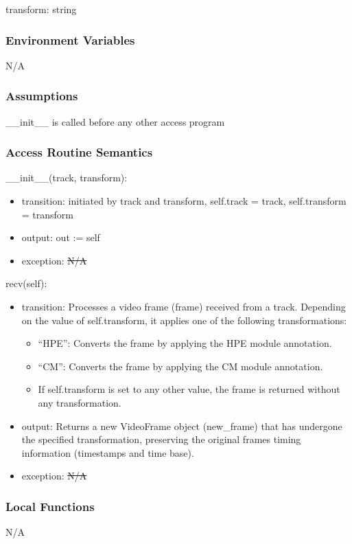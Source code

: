 \documentclass[12pt, titlepage]{article}
\newcommand{\rt}[1]{\textcolor{red}{#1}}
\begin{document}
transform: string

\subsubsection{Environment Variables}
N/A

\subsubsection{Assumptions}
\_\_init\_\_ is called before any other access program

\subsubsection{Access Routine Semantics}

\noindent \_\_init\_\_(track, transform):
\begin{itemize}
  \item transition: initiated by track and transform, self.track = track, self.transform = transform
  \item output: out := self
  \item exception: \sout{N/A} \rt{}
\end{itemize}

\noindent recv(self):
\begin{itemize}
\item transition: Processes a video frame (frame) received from a track. Depending
  on the value of self.transform, it applies one of the following
  transformations:
  \begin{itemize}
  \item ``HPE'': Converts the frame by applying the HPE module
    annotation.
  \item ``CM'': Converts the frame by applying the CM module annotation.
  \item If self.transform is set to any other value, the frame is returned without any
    transformation.
  \end{itemize}
\item output: Returns a new VideoFrame object (new\_frame) that has undergone the
  specified transformation, preserving the original frames timing information
  (timestamps and time base).
  \item exception: \sout{N/A} \rt{}
\end{itemize}

\subsubsection{Local Functions}
N/A
\end{document}
